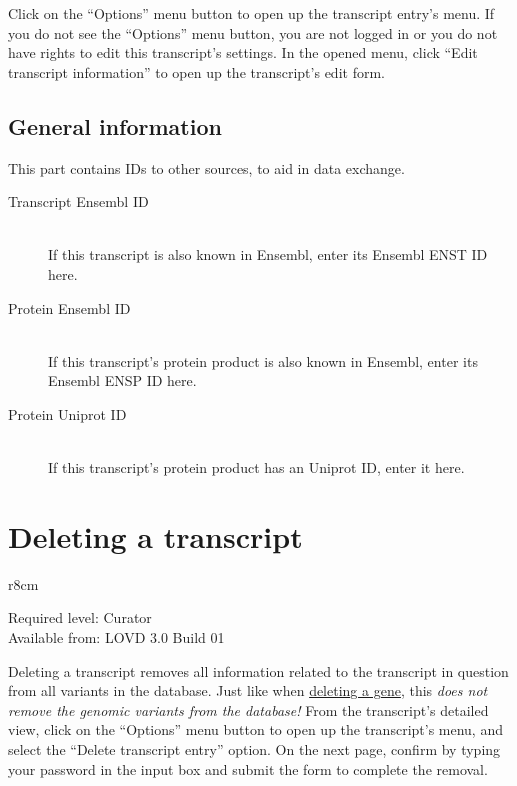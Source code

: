 Click on the ``Options'' menu button to open up the transcript entry's menu.
If you do not see the ``Options'' menu button, you are not logged in or you do not have rights to edit this transcript's settings.
In the opened menu, click ``Edit transcript information'' to open up the transcript's edit form.



\subsection{General information}
This part contains IDs to other sources, to aid in data exchange.
\begin{description}
  \item[Transcript Ensembl ID] \hfill \\
  If this transcript is also known in Ensembl, enter its Ensembl ENST ID here.
  \item[Protein Ensembl ID] \hfill \\
  If this transcript's protein product is also known in Ensembl, enter its Ensembl ENSP ID here.
  \item[Protein Uniprot ID] \hfill \\
  If this transcript's protein product has an Uniprot ID, enter it here.
\end{description}





\section{Deleting a transcript}
\begin{wrapfigure}[3]{r}{8cm} %
  \vspace{-25pt}
  \begin{leftbar}
    Required level: Curator\\
    Available from: LOVD 3.0 Build 01
  \end{leftbar}
\end{wrapfigure}
Deleting a transcript removes all information related to the transcript in question from all variants in the database.
Just like when \hyperlink{sec:gene_delete}{deleting a gene}, this \emph{does not remove the genomic variants from the database!}
From the transcript's detailed view, click on the ``Options'' menu button to open up the transcript's menu, and select the ``Delete transcript entry'' option.
On the next page, confirm by typing your password in the input box and submit the form to complete the removal.










